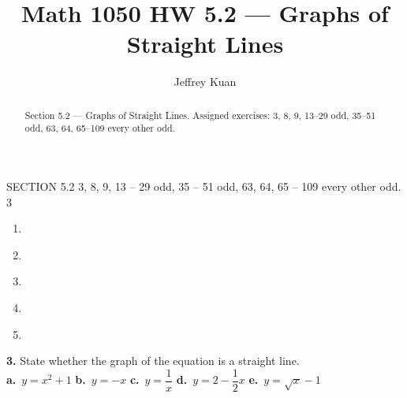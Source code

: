 \documentclass{ximera}
\author{Jeffrey Kuan}
\title{Math 1050 HW 5.2 --- Graphs of Straight Lines}
\begin{document}
\begin{abstract}
    Section 5.2 --- Graphs of Straight Lines.
    Assigned exercises: 3, 8, 9, 13–29 odd, 35–51 odd, 63, 64, 65–109 every other odd.
\end{abstract}

\maketitle

SECTION 5.2 3, 8, 9, 13 – 29 odd, 35 – 51 odd, 63, 64, 65 – 109 every other odd. 3 \begin{enumerate} \item \begin{multipleChoice}   \end{multipleChoice} \item \begin{multipleChoice}   \end{multipleChoice} \item \begin{multipleChoice}   \end{multipleChoice} \item \begin{multipleChoice}   \end{multipleChoice} \item \begin{multipleChoice}   \end{multipleChoice} \end{enumerate}

\begin{problem}
\textbf{3.} State whether the graph of the equation is a straight line.
  \\[2pt]
  \textbf{a.}~$y = x^2 + 1$ \quad \textbf{b.}~$y = -x$ \quad
  \textbf{c.}~$y = \dfrac{1}{x}$ \quad \textbf{d.}~$y = 2 - \dfrac{1}{2}x$ \quad
  \textbf{e.}~$y = \sqrt{x} - 1$

\begin{multipleChoice}
\end{multipleChoice}
\end{problem}
\end{document}
